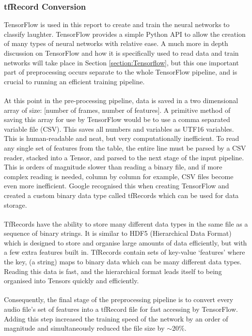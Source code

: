 \documentclass[a4paper,11pt,notitlepage]{article}
\begin{document}
\subsubsection{tfRecord Conversion}\label{section:tfRecord_conversion}

TensorFlow is used in this report to create and train the neural networks to classify laughter. TensorFlow provides a simple Python API to allow the creation of many types of neural networks with relative ease. A much more in depth discussion on TensorFlow and how it is specifically used to read data and train networks will take place in Section \ref{section:Tensorflow}, but this one important part of preprocessing occurs separate to the whole TensorFlow pipeline, and is crucial to running an efficient training pipeline.\\
\\
At this point in the pre-processing pipeline, data is saved in a two dimensional array of size: [number of frames, number of features]. A primitive method of saving this array for use by TensorFlow would be to use a comma separated variable file (CSV). This saves all numbers and variables as UTF16 variables. This is human-readable and neat, but very computationally inefficient. To read any single set of features from the table, the entire line must be parsed by a CSV reader, stacked into a Tensor, and parsed to the next stage of the input pipeline. This is orders of magnitude slower than reading a binary file, and if more complex reading is needed, column by column for example, CSV files become even more inefficient. Google recognised this when creating TensorFlow and created a custom binary data type called tfRecords which can be used for data storage.\\
\\
TfRecords have the ability to store many different data types in the same file as a sequence of binary strings. It is similar to HDF5 (Hierarchical Data Format) which is designed to store and organise large amounts of data efficiently, but with a few extra features built in. TfRecords contain sets of key-value `features' where the key, (a string) maps to binary data which can be many different data types. Reading this data is fast, and the hierarchical format leads itself to being organised into Tensors quickly and efficiently.\\
\\
Consequently, the final stage of the preprocessing pipeline is to convert every audio file's set of features into a tfRecord file for fast accessing by TensorFlow. Adding this step increased the training speed of the network by an order of magnitude and simultaneously reduced the file size by $\sim$20\%.
\end{document}
